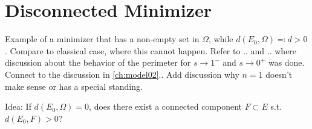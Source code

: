 \chapter{Disconnected Minimizer}
\label{ch:connected_minimizer}

Example of a minimizer that has a non-empty set in \( \Omega \), while \( d(E_{0},
\Omega) \eqqcolon d > 0  \).\newline
Compare to classical case, where this cannot happen. Refer to .. and .. where discussion
about the behavior of the perimeter for \( s \to 1^{-}  \) and \( s \to  0^{+}  \) was
done. \newline
Connect to the discussion in \cref{ch:model02}..\newline
Add discussion why \( n=1 \) doesn't make sense or has a special standing. \newline



Idea: If \( d(E_{0}, \Omega ) = 0  \), does there exist a connected component \( F \subset
E \) s.t.\ \( d(E_{0}, F) > 0 \)?
